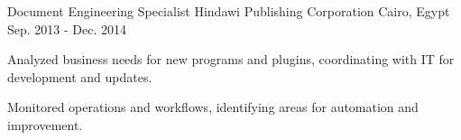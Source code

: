 \begin{cventries}
  \cventry
    {Document Engineering Specialist} %
    {Hindawi Publishing Corporation} %
    {Cairo, Egypt} %
    {Sep. 2013 - Dec. 2014} %
    {
      \begin{cvitems} %
        \item {Analyzed business needs for new programs and plugins, coordinating with IT for development and updates.}
        \item {Monitored operations and workflows, identifying areas for automation and improvement.}
      \end{cvitems}
    }



\end{cventries}
